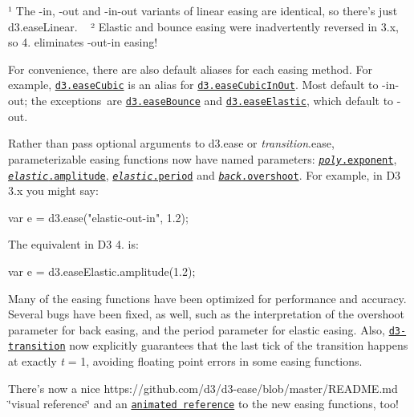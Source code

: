 ¹ The -\/in, -\/out and -\/in-\/out variants of linear easing are identical, so there’s just d3.\+ease\+Linear. ~\newline
² Elastic and bounce easing were inadvertently reversed in 3.\+x, so 4. eliminates -\/out-\/in easing!

For convenience, there are also default aliases for each easing method. For example, \href{https://github.com/d3/d3-ease/blob/master/README.md#easeCubic}{\tt d3.\+ease\+Cubic} is an alias for \href{https://github.com/d3/d3-ease/blob/master/README.md#easeCubicInOut}{\tt d3.\+ease\+Cubic\+In\+Out}. Most default to -\/in-\/out; the exceptions are \href{https://github.com/d3/d3-ease/blob/master/README.md#easeBounce}{\tt d3.\+ease\+Bounce} and \href{https://github.com/d3/d3-ease/blob/master/README.md#easeElastic}{\tt d3.\+ease\+Elastic}, which default to -\/out.

Rather than pass optional arguments to d3.\+ease or {\itshape transition}.ease, parameterizable easing functions now have named parameters\+: \href{https://github.com/d3/d3-ease/blob/master/README.md#poly_exponent}{\tt {\itshape poly}.exponent}, \href{https://github.com/d3/d3-ease/blob/master/README.md#elastic_amplitude}{\tt {\itshape elastic}.amplitude}, \href{https://github.com/d3/d3-ease/blob/master/README.md#elastic_period}{\tt {\itshape elastic}.period} and \href{https://github.com/d3/d3-ease/blob/master/README.md#back_overshoot}{\tt {\itshape back}.overshoot}. For example, in D3 3.\+x you might say\+:


\begin{DoxyCode}
var e = d3.ease("elastic-out-in", 1.2);
\end{DoxyCode}


The equivalent in D3 4. is\+:


\begin{DoxyCode}
var e = d3.easeElastic.amplitude(1.2);
\end{DoxyCode}


Many of the easing functions have been optimized for performance and accuracy. Several bugs have been fixed, as well, such as the interpretation of the overshoot parameter for back easing, and the period parameter for elastic easing. Also, \href{#transitions-d3-transition}{\tt d3-\/transition} now explicitly guarantees that the last tick of the transition happens at exactly {\itshape t} = 1, avoiding floating point errors in some easing functions.

There’s now a nice https\+://github.com/d3/d3-\/ease/blob/master/\+R\+E\+A\+D\+M\+E.\+md \char`\"{}visual reference\char`\"{} and an \href{https://bl.ocks.org/mbostock/248bac3b8e354a9103c4}{\tt animated reference} to the new easing functions, too!

